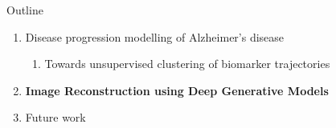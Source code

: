 \documentclass[8pt,xcolor=table,aspectratio=169]{beamer}
\begin{document}
\begin{frame}{Outline}

\begin{enumerate}
 \item Disease progression modelling of Alzheimer's disease
 \begin{enumerate} 
  \item Towards unsupervised clustering of biomarker trajectories\\
 \end{enumerate}
   
 
  
  \vt

 \item \textbf{Image Reconstruction using Deep Generative Models}\\
\brgmoursshort
\vt
 
  \item Future work\\

\end{enumerate}
\end{frame}



\end{document}
